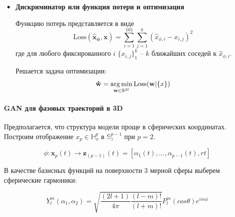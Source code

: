 \documentclass[12pt,twoside]{article}
\begin{document}
\begin{itemize}
\item \textbf{Дискриминатор или функция потери и оптимизация}

Функцию потерь представляется в виде
\begin{equation}
\textrm{Loss}\mathbf{(\hat{x}_{\phi},x)} =  \sum_{i=1}^{101}\sum_{j=1}^{k}(\hat{x}_{\phi,i} - x_{i,j})^2
\label{eq:L}
\end{equation}
где для любого фиксированного $i$\; $\{x_{i,j}\}_1^k$ -- $k$ ближайших соседей к $\hat{x}_{\phi,i}$.

Решается задача оптимизации:
\begin{equation}
\mathbf{\hat{w}} = \argmin_{\mathbf{w} \in \mathbb{R}^{2l}} \textrm{Loss}(\mathbf{w}|\{x\})
\label{eq:arg_l}
\end{equation}
\end{itemize}

\paragraph{GAN для фазовых траекторий в 3D}

Предполагается, что структура модели проще в сферических координатах.
Построим отображение $x_p \in \mathbb{H}_{x}^{p} $ в $\mathbb{S}_{z}^{p-1} $ при $p = 2$.

\begin{equation}
	\phi: \mathbf{x}_p(t)  \xrightarrow{} \mathbf{z}_{(p-1)}(t) = [\alpha_{1} (t),..., \alpha_{p-1}(t), r{t}]
\label{eq:param_model2}
\end{equation}

В качестве базисных функций на поверхности 3 мерной сферы выберем сферические гармоники:

\begin{equation}
	Y_l^m(\alpha_1,\alpha_2) = \sqrt{ \frac{(2l+1)}{4\pi} \frac{(l-m)!}{(l+m)!} } P_l^m(cos\theta)e^{im\phi}
\label{eq:Yml}
\end{equation}
\end{document}
